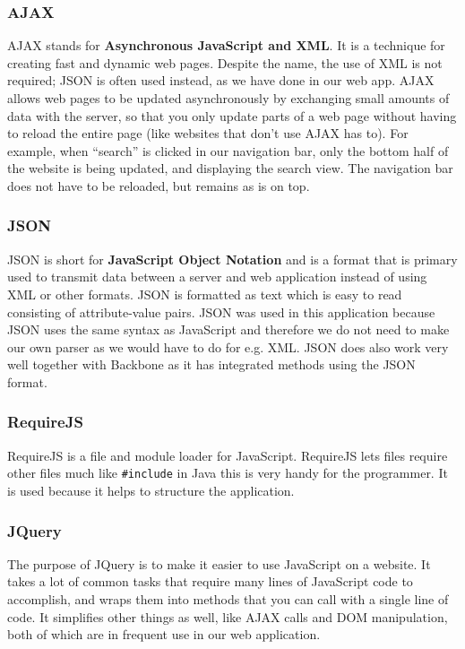 \subsubsection{AJAX}
AJAX\cite{web_3} stands for \textbf{Asynchronous JavaScript and XML}. It is a technique for creating fast and dynamic web pages. Despite the name, the use of XML is not required; JSON is often used instead, as we have done in our web app. AJAX allows web pages to be updated asynchronously by exchanging small amounts of data with the server, so that you only update parts of a web page without having to reload the entire page (like websites that don’t use AJAX has to). For example, when “search” is clicked in our navigation bar, only the bottom half of the website is being updated, and displaying the search view. The navigation bar does not have to be reloaded, but remains as is on top.

\subsubsection{JSON}
JSON\cite{web_4} is short for \textbf{JavaScript Object Notation} and is a format that is primary used to transmit data between a server and web application instead of using XML or other formats.
JSON is formatted as text which is easy to read consisting of attribute-value pairs.
JSON was used in this application because JSON uses the same syntax as JavaScript and therefore we do not need to make our own parser as we would have to do for e.g. XML. JSON does also work very well together with Backbone as it has integrated methods using the JSON format.

\subsubsection{RequireJS}
RequireJS\cite{web_5} is a file and module loader for JavaScript. RequireJS lets files require other files much like \texttt{\#include} in Java this is very handy for the programmer. It is used because it helps to structure the application.
\subsubsection{JQuery}
The purpose of JQuery\cite{web_6} is to make it easier to use JavaScript on a website. It takes a lot of common tasks that require many lines of JavaScript code to accomplish, and wraps them into methods that you can call with a single line of code. It simplifies other things as well, like AJAX calls and DOM manipulation, both of which are in frequent use in our web application.
